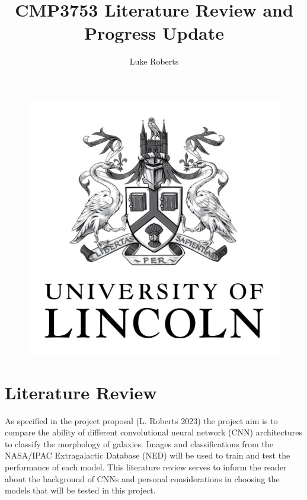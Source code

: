 \documentclass[12pt,runningheads]{llncs}
\begin{document}
\title{CMP3753 Literature Review and Progress Update}

\author{Luke Roberts}


\maketitle

\begin{figure}[h]
    \includegraphics[scale=0.7]{UOL_Logo.jpg}
    \centering
\end{figure}

\newpage

\section{Literature Review}

\noindent As specified in the project proposal (L. Roberts 2023) the project aim
is to compare the ability of different convolutional neural network (CNN)
architectures to classify the morphology of galaxies. Images and
classifications from the NASA/IPAC Extragalactic Database (NED) will be
used to train and test the performance of each model. This literature
review serves to inform the reader about the background of CNNs and
personal considerations in choosing the models that will be tested in
this project.
\end{document}
